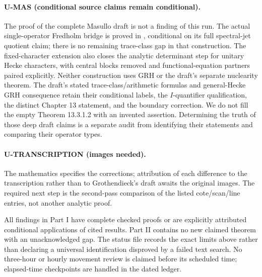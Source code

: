 \paragraph{U-MAS (conditional source claims remain conditional).}
The proof of the complete Masullo draft is not a finding of this run. The actual single-operator Fredholm bridge is proved in , conditional on its full spectral-jet quotient claim; there is no remaining trace-class gap in that construction. The fixed-character extension  also closes the analytic determinant step for unitary Hecke characters, with central blocks removed and functional-equation partners paired explicitly. Neither construction uses GRH or the draft's separate nuclearity theorem. The draft's stated trace-class/arithmetic formulas and general-Hecke GRH consequence retain their conditional labels, the $I$-quantifier qualification, the distinct Chapter 13 statement, and the boundary correction. We do not fill the empty Theorem 13.3.1.2 with an invented assertion. Determining the truth of those deep draft claims is a separate audit from identifying their statements and comparing their operator types.

\paragraph{U-TRANSCRIPTION (images needed).}
The mathematics specifies the corrections; attribution of each difference to the transcription rather than to Grothendieck's draft awaits the original images. The required next step is the second-pass comparison of the listed cote/scan/line entries, not another analytic proof.

All findings in Part I have complete checked proofs or are explicitly attributed conditional applications of cited results. Part II contains no new claimed theorem with an unacknowledged gap. The status file records the exact limits above rather than declaring a universal identification disproved by a failed text search. No three-hour or hourly movement review is claimed before its scheduled time; elapsed-time checkpoints are handled in the dated ledger.

